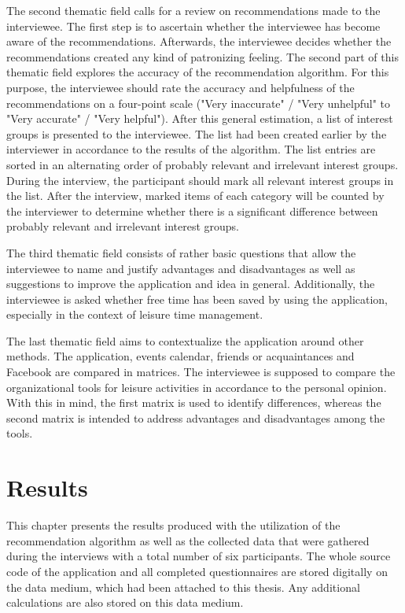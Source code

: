 \documentclass[12pt,numbers=noenddot,parskip,bibliography=totocnumbered,listof=totocnumbered,draft]{scrreprt}
\begin{document}
The second thematic field calls for a review on recommendations made to the interviewee. The first step is to ascertain whether the interviewee has become aware of the recommendations. Afterwards, the interviewee decides whether the recommendations created any kind of patronizing feeling. The second part of this thematic field explores the accuracy of the recommendation algorithm. For this purpose, the interviewee should rate the accuracy and helpfulness of the recommendations on a four-point scale ("Very inaccurate" / "Very unhelpful" to "Very accurate" / "Very helpful"). After this general estimation, a list of interest groups is presented to the interviewee. The list had been created earlier by the interviewer in accordance to the results of the algorithm. The list entries are sorted in an alternating order of probably relevant and irrelevant interest groups. During the interview, the participant should mark all relevant interest groups in the list. After the interview, marked items of each category will be counted by the interviewer to determine whether there is a significant difference between probably relevant and irrelevant interest groups.

The third thematic field consists of rather basic questions that allow the interviewee to name and justify advantages and disadvantages as well as suggestions to improve the application and idea in general. Additionally, the interviewee is asked whether free time has been saved by using the application, especially in the context of leisure time management.

The last thematic field aims to contextualize the application around other methods. The application, events calendar, friends or acquaintances and Facebook are compared in matrices. The interviewee is supposed to compare the organizational tools for leisure activities in accordance to the personal opinion. With this in mind, the first matrix is used to identify differences, whereas the second matrix is intended to address advantages and disadvantages among the tools.

\chapter{Results}
This chapter presents the results produced with the utilization of the recommendation algorithm as well as the collected data that were gathered during the interviews with a total number of six participants. The whole source code of the application and all completed questionnaires are stored digitally on the data medium, which had been attached to this thesis. Any additional calculations are also stored on this data medium.
\end{document}
